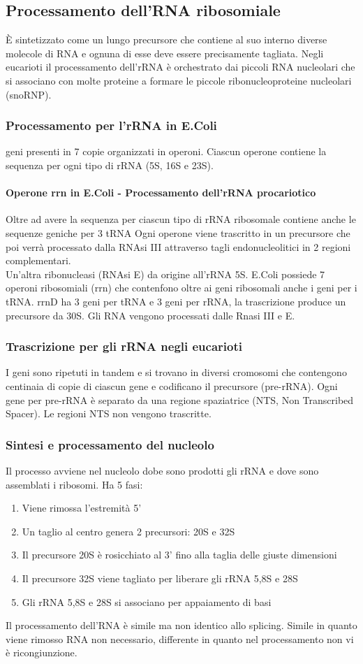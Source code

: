 \documentclass{article}
\begin{document}
\subsection{Processamento dell'RNA ribosomiale}
È sintetizzato come un lungo precursore che contiene al suo interno diverse molecole di RNA e ognuna di esse deve essere 
precisamente tagliata. Negli eucarioti il processamento dell'rRNA è orchestrato dai piccoli RNA nucleolari che si associano con molte proteine a formare le piccole ribonucleoproteine nucleolari (snoRNP).
\subsubsection{Processamento per l'rRNA in E.Coli}
geni presenti in 7 copie organizzati in operoni. Ciascun operone contiene la sequenza per
ogni tipo di rRNA (5S, 16S e 23S). 
\paragraph{Operone rrn in E.Coli - Processamento dell'rRNA procariotico}
Oltre ad avere la sequenza per ciascun tipo di rRNA ribosomale contiene anche le sequenze geniche per 3 tRNA
Ogni operone viene trascritto in un precursore che poi verrà processato dalla RNAsi III attraverso
tagli endonucleolitici in 2 regioni complementari.\\
Un'altra ribonucleasi (RNAsi E) da origine all'rRNA 5S.
E.Coli possiede 7 operoni ribosomiali (rrn) che contenfono oltre ai geni ribosomali anche i geni per i tRNA. rrnD ha 3 geni per tRNA e 3 geni per rRNA, la trascrizione produce un precursore da 30S. Gli RNA vengono processati dalle
Rnasi III e E.
\subsubsection{Trascrizione per gli rRNA negli eucarioti}
I geni sono ripetuti in tandem e si trovano in diversi cromosomi che contengono centinaia di copie di ciascun gene e codificano il
precursore (pre-rRNA). Ogni gene per pre-rRNA è separato da una regione
spaziatrice (NTS, Non Transcribed Spacer). Le regioni NTS non vengono trascritte.
\subsubsection{Sintesi e processamento del nucleolo}
Il processo avviene nel nucleolo dobe sono prodotti gli rRNA e dove sono assemblati i ribosomi. Ha 5 fasi:
\begin{enumerate}
    \item Viene rimossa l'estremità 5'
    \item Un taglio al centro genera 2 precursori: 20S e 32S
    \item Il precursore 20S è rosicchiato al 3' fino alla taglia delle giuste dimensioni
    \item Il precursore 32S viene tagliato per liberare gli rRNA 5,8S e 28S
    \item Gli rRNA 5,8S e 28S si associano per appaiamento di basi
\end{enumerate}
Il processamento dell'RNA è simile ma non identico allo splicing. Simile in quanto viene rimosso RNA non necessario, differente in quanto nel processamento non vi è ricongiunzione.
\end{document}
